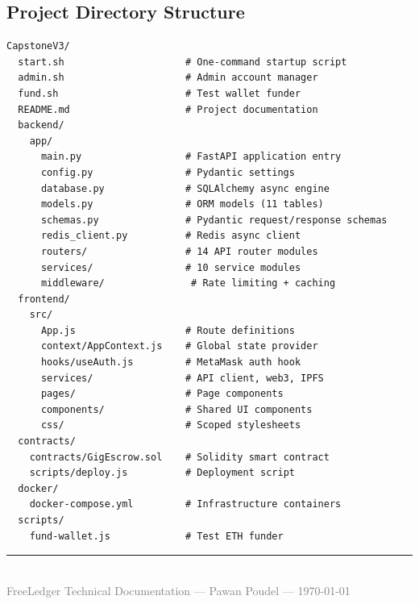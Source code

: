 \documentclass[12pt,a4paper]{article}
\begin{document}
\subsection{Project Directory Structure}
\begin{lstlisting}[basicstyle=\ttfamily\scriptsize]
CapstoneV3/
  start.sh                     # One-command startup script
  admin.sh                     # Admin account manager
  fund.sh                      # Test wallet funder
  README.md                    # Project documentation
  backend/
    app/
      main.py                  # FastAPI application entry
      config.py                # Pydantic settings
      database.py              # SQLAlchemy async engine
      models.py                # ORM models (11 tables)
      schemas.py               # Pydantic request/response schemas
      redis_client.py          # Redis async client
      routers/                 # 14 API router modules
      services/                # 10 service modules
      middleware/               # Rate limiting + caching
  frontend/
    src/
      App.js                   # Route definitions
      context/AppContext.js    # Global state provider
      hooks/useAuth.js         # MetaMask auth hook
      services/                # API client, web3, IPFS
      pages/                   # Page components
      components/              # Shared UI components
      css/                     # Scoped stylesheets
  contracts/
    contracts/GigEscrow.sol    # Solidity smart contract
    scripts/deploy.js          # Deployment script
  docker/
    docker-compose.yml         # Infrastructure containers
  scripts/
    fund-wallet.js             # Test ETH funder
\end{lstlisting}

\vfill
\begin{center}
\textcolor{gray}{\rule{0.5\textwidth}{0.4pt}}\\[0.5cm]
{\small\textcolor{gray}{FreeLedger Technical Documentation --- Pawan Poudel --- \today}}
\end{center}
\end{document}
